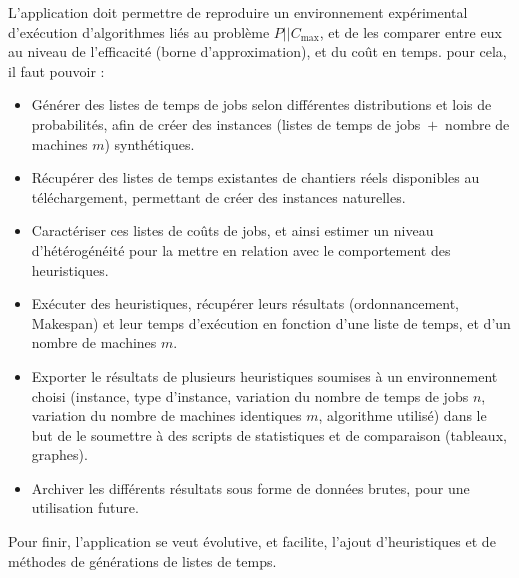 \documentclass[a4paper,12pt]{report}
\theoremstyle{plain}				%
\theoremstyle{definition}				%
\newcommand\problemGrahamP{$P||C_{\max}$\xspace}
\begin{document}
\begin{appendices}



L'application doit permettre de reproduire un environnement expérimental d'exécution d'algorithmes liés au problème \problemGrahamP, et de les comparer entre eux au niveau de l'efficacité (borne d'approximation), et du coût en temps.
pour cela, il faut pouvoir :
\begin{itemize}
\item Générer des listes de temps de jobs selon différentes distributions et lois de probabilités, 
  afin de créer des instances (listes de temps de jobs~$+$~nombre de machines $m$) synthétiques. 
\item Récupérer des listes de temps existantes de chantiers réels disponibles au téléchargement, 
  permettant de créer des instances naturelles.
\item Caractériser ces listes de coûts de jobs, et ainsi estimer un niveau d’hétérogénéité 
  pour la mettre en relation avec le comportement des heuristiques.
\item Exécuter des heuristiques, récupérer leurs résultats (ordonnancement, Makespan) 
  et leur temps d’exécution 
  en fonction d'une liste de temps, et d'un nombre de machines $m$.
\item Exporter le résultats de plusieurs heuristiques soumises à 
  un environnement choisi 
  (instance, type  d'instance, variation du nombre de temps de jobs $n$, 
  variation du nombre de machines identiques $m$, algorithme utilisé) 
  dans le but de le soumettre à des scripts de statistiques et de comparaison (tableaux, graphes).
\item Archiver les différents résultats sous forme de données brutes, pour une utilisation future. 
\end{itemize} 
Pour finir, l'application se veut évolutive, et facilite, l'ajout d'heuristiques et de méthodes de générations de listes de temps.



\end{appendices}
\end{document}

